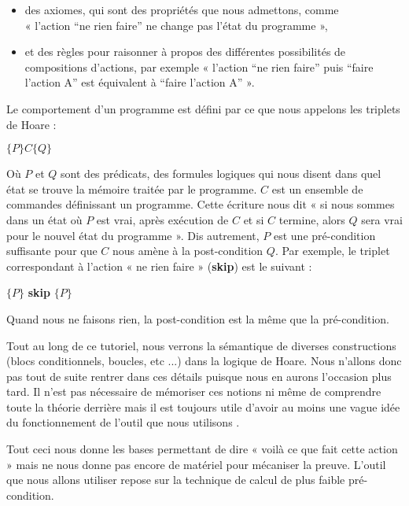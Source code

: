 \documentclass[middle]{zmdocument}
\begin{document}
\begin{itemize}
\item des axiomes, qui sont des propriétés que nous admettons, comme \\
« l'action “ne rien faire” ne change pas l'état du programme »,
\item et des règles pour raisonner à propos des différentes possibilités de 
compositions d'actions, par exemple « l'action “ne rien faire” puis “faire 
l'action A” est équivalent à “faire l'action A” ».
\end{itemize}


Le comportement d'un programme est défini par ce que nous appelons les triplets
de Hoare :




\begin{center}
$\{P\} C \{Q\}$


\end{center}


Où $P$ et $Q$ sont des prédicats, des formules logiques qui nous disent dans 
quel état se trouve la mémoire traitée par le programme. $C$ est un ensemble de
commandes définissant un programme. Cette écriture nous dit « si nous sommes 
dans un état où $P$ est vrai, après exécution de $C$ et si $C$ termine, 
alors $Q$ sera vrai pour le nouvel état du programme ». Dis autrement, $P$ est 
une pré-condition suffisante pour que $C$ nous amène à la post-condition $Q$. 
Par exemple, le triplet correspondant à l'action « ne rien faire » (\textbf{skip}) 
est le suivant :




\begin{center}
$\{P\}$ \textbf{skip} $\{P\}$


\end{center}


Quand nous ne faisons rien, la post-condition est la même que la pré-condition.



Tout au long de ce tutoriel, nous verrons la sémantique de diverses 
constructions (blocs conditionnels, boucles, etc ...) dans la logique de Hoare.
Nous n'allons donc pas tout de suite rentrer dans ces détails puisque nous en
aurons l'occasion plus tard. Il n'est pas nécessaire de mémoriser ces notions
ni même de comprendre toute la théorie derrière mais il est toujours utile
d'avoir au moins une vague idée du fonctionnement de l'outil que nous
utilisons  .



Tout ceci nous donne les bases permettant de dire « voilà ce que fait cette 
action » mais ne nous donne pas encore de matériel pour mécaniser la preuve. 
L'outil que nous allons utiliser repose sur la technique de calcul de plus 
faible pré-condition.
\end{document}
